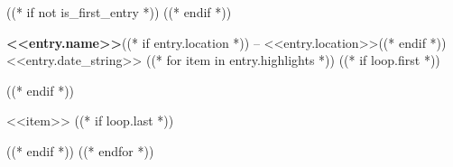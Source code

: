 ((* if not is_first_entry *))
\vspace{<<design.margins.entry_area.vertical_between>>}
((* endif *))

\begin{onecolentry}
    \textbf{<<entry.name>>}((* if entry.location *)) -- <<entry.location>>((* endif *)) \hfill <<entry.date_string>>
((* for item in entry.highlights *))
    ((* if loop.first *))
    \begin{highlights}
    ((* endif *))
        \item <<item>>
    ((* if loop.last *))
    \end{highlights}
    ((* endif *))
((* endfor *))
\end{onecolentry}
